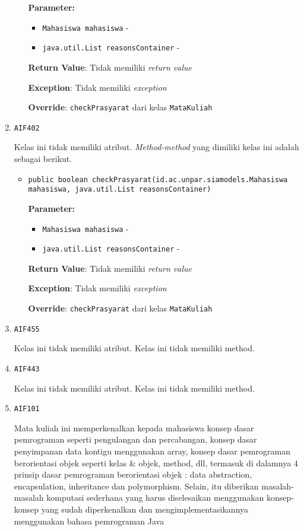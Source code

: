\documentclass{article}
\begin{document}
\begin{enumerate}
\begin{itemize}
\textbf{Parameter:}
\begin{itemize}
\item \texttt{Mahasiswa mahasiswa} - 
\item \texttt{java.util.List reasonsContainer} - 
\end{itemize}
\textbf{Return Value}: Tidak memiliki \textit{return value}

\textbf{Exception}: Tidak memiliki \textit{exception}

\textbf{Override}: \texttt{checkPrasyarat} dari kelas \texttt{MataKuliah}

\end{itemize}
\item \texttt{AIF402}



Kelas ini tidak memiliki atribut. \textit{Method-method} yang dimiliki kelas ini adalah sebagai berikut.
\begin{itemize}
\item \texttt{public boolean checkPrasyarat(id.ac.unpar.siamodels.Mahasiswa mahasiswa, java.util.List reasonsContainer)}

\textbf{Parameter:}
\begin{itemize}
\item \texttt{Mahasiswa mahasiswa} - 
\item \texttt{java.util.List reasonsContainer} - 
\end{itemize}
\textbf{Return Value}: Tidak memiliki \textit{return value}

\textbf{Exception}: Tidak memiliki \textit{exception}

\textbf{Override}: \texttt{checkPrasyarat} dari kelas \texttt{MataKuliah}

\end{itemize}
\item \texttt{AIF455}



Kelas ini tidak memiliki atribut. Kelas ini tidak memiliki method. \item \texttt{AIF443}



Kelas ini tidak memiliki atribut. Kelas ini tidak memiliki method. \item \texttt{AIF101}

Mata kuliah ini memperkenalkan kepada mahasiswa konsep dasar pemrograman 
 seperti pengulangan dan percabangan, konsep dasar penyimpanan data kontigu 
 menggunakan array, konsep dasar pemrograman berorientasi objek seperti kelas 
 \& objek, method, dll, termasuk di dalamnya 4 prinsip dasar pemrograman 
 berorientasi objek : data abstraction, encapsulation, inheritance dan 
 polymorphism. Selain, itu diberikan masalah-masalah komputasi sederhana 
 yang harus diselesaikan menggunakan konsep-konsep yang  sudah diperkenalkan 
 dan mengimplementasikannya menggunakan bahasa pemrograman Java


\end{enumerate}
\end{document}
